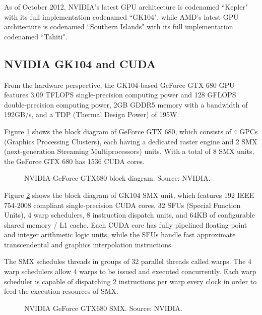 As of October 2012, NVIDIA’s latest GPU architecture is codenamed ``Kepler" with its full implementation codenamed ``GK104", while AMD's latest GPU architecture is codenamed ``Southern Islands" with its full implementation codenamed ``Tahiti".

\subsection{NVIDIA GK104 and CUDA}

From the hardware perspective, the GK104-based GeForce GTX 680 GPU features 3.09 TFLOPS single-precision computing power and 128 GFLOPS double-precision computing power, 2GB GDDR5 memory with a bandwidth of 192GB/s, and a TDP (Thermal Design Power) of 195W.

Figure \ref{idock:GeForceGTX680BlockDiagram} shows the block diagram of GeForce GTX 680, which consists of 4 GPCs (Graphics Processing Clusters), each having a dedicated raster engine and 2 SMX (next-generation Streaming Multiprocessors) units. With a total of 8 SMX units, the GeForce GTX 680 has 1536 CUDA cores.

\begin{figure}
\centering
\caption{NVIDIA GeForce GTX680 block diagram. Source: NVIDIA.}
\label{idock:GeForceGTX680BlockDiagram}
\end{figure}

Figure \ref{idock:GeForceGTX680SMX} shows the block diagram of GK104 SMX unit, which features 192 IEEE 754-2008 compliant single-precision CUDA cores, 32 SFUs (Special Function Units), 4 warp schedulers, 8 instruction dispatch units, and 64KB of configurable shared memory / L1 cache. Each CUDA core has fully pipelined floating-point and integer arithmetic logic units, while the SFUs handle fast approximate transcendental and graphics interpolation instructions.

The SMX schedules threads in groups of 32 parallel threads called warps. The 4 warp schedulers allow 4 warps to be issued and executed concurrently. Each warp scheduler is capable of dispatching 2 instructions per warp every clock in order to feed the execution resources of SMX.

\begin{figure}
\centering
\caption{NVIDIA GeForce GTX680 SMX. Source: NVIDIA.}
\label{idock:GeForceGTX680SMX}
\end{figure}

